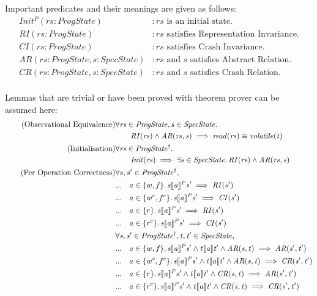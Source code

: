 \documentclass[a4paper,11pt]{article}
\theoremstyle{definition}
\begin{document}
Important predicates and their meanings are given as follows:
\begin{align*}
	\mathit{Init^P(rs : ProgState)} &: \text{$\mathit{rs}$ is an initial state.}\\
	\mathit{RI(rs : ProgState)} &: \text{$\mathit{rs}$ satisfies Representation Invariance.} \\
	\mathit{CI(rs : ProgState)} &: \text{$\mathit{rs}$ satisfies Crash Invariance.} \\
	\mathit{AR(rs : ProgState, s : SpecState)} &: \text{$\mathit{rs}$ and $s$ satisfies Abstract Relation.} \\
	\mathit{CR(rs : ProgState, s : SpecState)} &: \text{$\mathit{rs}$ and $s$ satisfies Crash Relation.} \\
\end{align*}

Lemmas that are trivial or have been proved with theorem prover can be assumed here:
\begin{align*}
	\tag{Observational Equivalence} & \forall \mathit{rs} \in \mathit{ProgState},s \in \mathit{SpecState} \ldotp \\
	& \qquad \mathit{RI(rs)} \land \mathit{AR(rs, s)} \implies \mathit{read(rs)} \equiv \mathit{volatile(t)} \\
	\tag{Initialisation} &\forall \mathit{rs} \in \mathit{ProgState^\dagger} \ldotp\\
	&\qquad \mathit{Init(rs) \implies \exists s \in SpecState \ldotp RI(rs) \land AR(rs, s)}\\
	\tag{Per Operation Correctness} & \forall s, s' \in \mathit{ProgState^\dagger},\\
	&...	 \quad a \in \{w, f\} \ldotp \mathit{s \llbracket a \rrbracket^P s' \implies RI(s')}\\
	&...	 \quad a \in \{w^c, f^c\} \ldotp \mathit{s \llbracket a \rrbracket^P s' \implies CI(s')}\\
	&...	 \quad a \in \{r\} \ldotp \mathit{s \llbracket a \rrbracket^P s' \implies RI(s')}\\
	&...	 \quad a \in \{r^c\} \ldotp \mathit{s \llbracket a \rrbracket^P s' \implies CI(s')}\\
	&\mathit{\forall s, s' \in ProgState^\dagger, t, t' \in SpecState,}\\
	&...	 \quad a \in \{w, f\} \ldotp \mathit{s \llbracket a \rrbracket^P s' \land t \llbracket a \rrbracket t' \land AR(s, t) \implies AR(s', t')}\\
	&...	 \quad a \in \{w^c, f^c\} \ldotp \mathit{s \llbracket a \rrbracket^P s' \land t \llbracket a \rrbracket t' \land AR(s, t) \implies CR(s', t')}\\
	&...	 \quad a \in \{r\} \ldotp \mathit{s \llbracket a \rrbracket^P s' \land t \llbracket a \rrbracket t' \land CR(s, t) \implies AR(s', t')}\\
	&...	 \quad a \in \{r^c\} \ldotp \mathit{s \llbracket a \rrbracket^P s' \land t \llbracket a \rrbracket t' \land CR(s, t) \implies CR(s', t')}\\
\end{align*}
\end{document}
